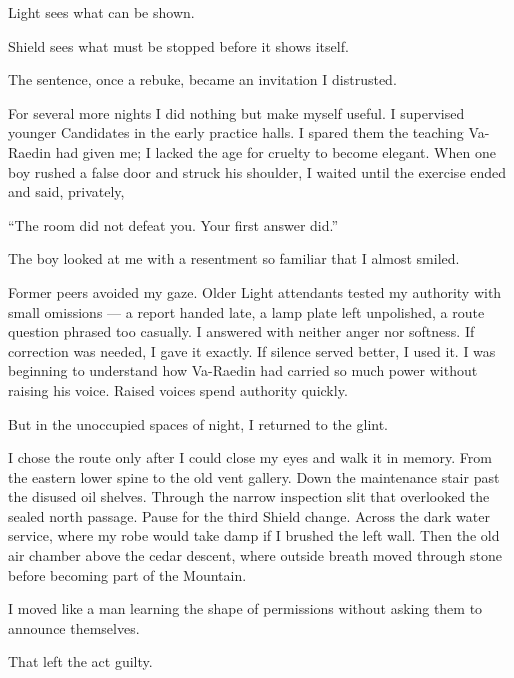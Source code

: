 Light sees what can be shown.\par

Shield sees what must be stopped before it shows itself.\par

The sentence, once a rebuke, became an invitation I distrusted.\par

For several more nights I did nothing but make myself useful. I supervised younger Candidates in the early practice halls. I spared them the teaching Va-Raedin had given me; I lacked the age for cruelty to become elegant. When one boy rushed a false door and struck his shoulder, I waited until the exercise ended and said, privately,\par

``The room did not defeat you. Your first answer did.''\par

The boy looked at me with a resentment so familiar that I almost smiled.\par

Former peers avoided my gaze. Older Light attendants tested my authority with small omissions --- a report handed late, a lamp plate left unpolished, a route question phrased too casually. I answered with neither anger nor softness. If correction was needed, I gave it exactly. If silence served better, I used it. I was beginning to understand how Va-Raedin had carried so much power without raising his voice. Raised voices spend authority quickly.\par

But in the unoccupied spaces of night, I returned to the glint.\par

I chose the route only after I could close my eyes and walk it in memory. From the eastern lower spine to the old vent gallery. Down the maintenance stair past the disused oil shelves. Through the narrow inspection slit that overlooked the sealed north passage. Pause for the third Shield change. Across the dark water service, where my robe would take damp if I brushed the left wall. Then the old air chamber above the cedar descent, where outside breath moved through stone before becoming part of the Mountain.\par

I moved like a man learning the shape of permissions without asking them to announce themselves.\par

That left the act guilty.\par

